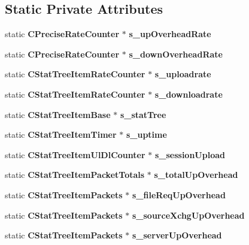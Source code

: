 \subsection*{Static Private Attributes}
\begin{DoxyCompactItemize}
\item 
static {\bf CPreciseRateCounter} $\ast$ {\bfseries s\_\-upOverheadRate}\label{classCStatistics_a77deb8d5d907516d4d09e9af57293e1d}

\item 
static {\bf CPreciseRateCounter} $\ast$ {\bfseries s\_\-downOverheadRate}\label{classCStatistics_a18e677ca2c5ae02ee4a0c702362b912c}

\item 
static {\bf CStatTreeItemRateCounter} $\ast$ {\bfseries s\_\-uploadrate}\label{classCStatistics_aec714bbad52a272ad9f4c4091813ba86}

\item 
static {\bf CStatTreeItemRateCounter} $\ast$ {\bfseries s\_\-downloadrate}\label{classCStatistics_abdbea337ad7c93e40ccbca85e9f43995}

\item 
static {\bf CStatTreeItemBase} $\ast$ {\bfseries s\_\-statTree}\label{classCStatistics_a9240fe0fbb8e44549f5f6c289810b946}

\item 
static {\bf CStatTreeItemTimer} $\ast$ {\bfseries s\_\-uptime}\label{classCStatistics_a8b2c1036857a65b603fd6555fe06b3d0}

\item 
static {\bf CStatTreeItemUlDlCounter} $\ast$ {\bfseries s\_\-sessionUpload}\label{classCStatistics_a049bcc208a86fd7e7ef4348f16cfece7}

\item 
static {\bf CStatTreeItemPacketTotals} $\ast$ {\bfseries s\_\-totalUpOverhead}\label{classCStatistics_a3f0f6b58ae360a162557668d167ad0a5}

\item 
static {\bf CStatTreeItemPackets} $\ast$ {\bfseries s\_\-fileReqUpOverhead}\label{classCStatistics_ae1536d35a150d3fe7ff71063508658be}

\item 
static {\bf CStatTreeItemPackets} $\ast$ {\bfseries s\_\-sourceXchgUpOverhead}\label{classCStatistics_a134db53860fbbd7c89d625c5b596dc22}

\item 
static {\bf CStatTreeItemPackets} $\ast$ {\bfseries s\_\-serverUpOverhead}\label{classCStatistics_a9ce7582aca38a0a1689043e2ccf5f404}


\end{DoxyCompactItemize}
